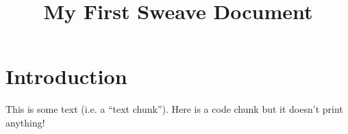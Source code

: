 \documentclass[11pt]{article}
\title{My First Sweave Document}
\begin{document}
\maketitle

\section{Introduction}
This is some text (i.e. a ``text chunk'').   
Here is a code chunk but it doesn't print anything!
\end{document}

